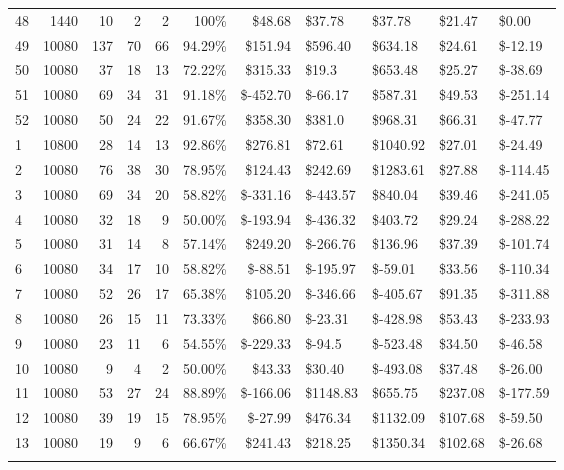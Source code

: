 \documentclass[12pt,english,authoryear]{article}
\begin{document}
\begin{table}[ht]
{\begin{tabular}{lrrrrrrllll}
48&1440&10&2&2&100\%&\$48.68&\$37.78&\$37.78&\$21.47&\$0.00\\
49&10080&137&70&66&94.29\%&\$151.94&\$596.40&\$634.18&\$24.61&\$-12.19\\
50&10080&37&18&13&72.22\%&\$315.33&\$19.3&\$653.48&\$25.27&\$-38.69\\
51&10080&69&34&31&91.18\%&\$-452.70&\$-66.17&\$587.31&\$49.53&\$-251.14\\
52&10080&50&24&22&91.67\%&\$358.30&\$381.0&\$968.31&\$66.31&\$-47.77\\
1&10800&28&14&13&92.86\%&\$276.81&\$72.61&\$1040.92&\$27.01&\$-24.49\\
2&10080&76&38&30&78.95\%&\$124.43&\$242.69&\$1283.61&\$27.88&\$-114.45\\
3&10080&69&34&20&58.82\%&\$-331.16&\$-443.57&\$840.04&\$39.46&\$-241.05\\
4&10080&32&18&9&50.00\%&\$-193.94&\$-436.32&\$403.72&\$29.24&\$-288.22\\
5&10080&31&14&8&57.14\%&\$249.20&\$-266.76&\$136.96&\$37.39&\$-101.74\\
6&10080&34&17&10&58.82\%&\$-88.51&\$-195.97&\$-59.01&\$33.56&\$-110.34\\
7&10080&52&26&17&65.38\%&\$105.20&\$-346.66&\$-405.67&\$91.35&\$-311.88\\
8&10080&26&15&11&73.33\%&\$66.80&\$-23.31&\$-428.98&\$53.43&\$-233.93\\
9&10080&23&11&6&54.55\%&\$-229.33&\$-94.5&\$-523.48&\$34.50&\$-46.58\\
10&10080&9&4&2&50.00\%&\$43.33&\$30.40&\$-493.08&\$37.48&\$-26.00\\
11&10080&53&27&24&88.89\%&\$-166.06&\$1148.83&\$655.75&\$237.08&\$-177.59\\
12&10080&39&19&15&78.95\%&\$-27.99&\$476.34&\$1132.09&\$107.68&\$-59.50\\
13&10080&19&9&6&66.67\%&\$241.43&\$218.25&\$1350.34&\$102.68&\$-26.68\\
\Xhline{1.5\arrayrulewidth}
\end{tabular}}
\end{table}
\end{document}
